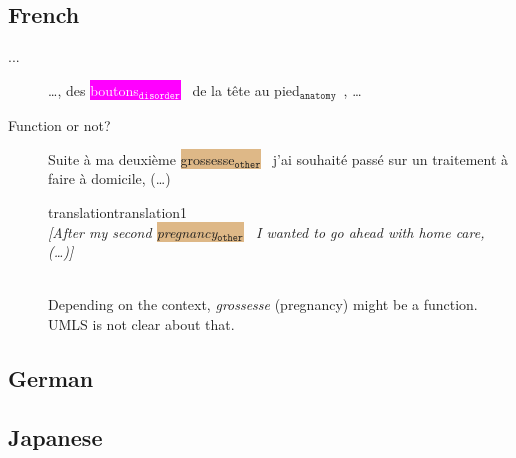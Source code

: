 \documentclass[12pt]{article}
\theoremstyle{definition}
\newcommand{\anatomy}[1]{\colorbox{dollarbill}{#1$_{\texttt{anatomy}}$}\ }
\newcommand{\disorder}[1]{\colorbox{fuchsia}{\textcolor{white}{#1$_{\texttt{disorder}}$}}\ }
\newcommand{\other}[1]{\colorbox{burlywood}{#1$_{\texttt{other}}$}\ }
\newcommand{\translation}[1]{\begin{ocg}{translation}{translation}{1}\footnotesize{\\\textit{[#1]}}\end{ocg}}
\begin{document}
\subsection{French}

\begin{description}
    \item[...] \ldots, des \disorder{boutons} \anatomy{de la tête au pied}, \ldots
    
    \item[Function or not?] Suite à ma deuxième \other{grossesse} j'ai souhaité passé sur un traitement à faire à domicile, (\ldots) \translation{After my second \other{pregnancy} I wanted to go ahead with home care, (\ldots)}\\
    Depending on the context, \textit{grossesse} (pregnancy) might be a function. UMLS is not clear about that.

\end{description}

\subsection{German}

\subsection{Japanese}
    
\end{document}
